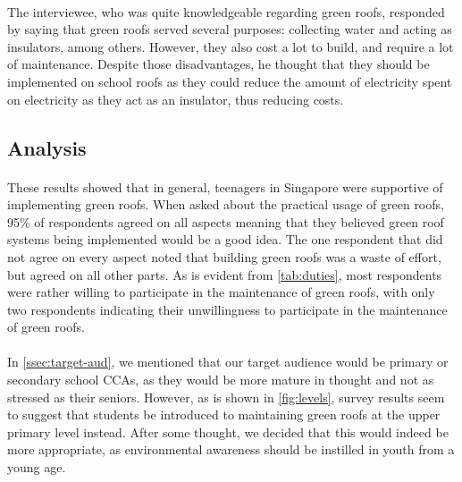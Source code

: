 \documentclass[a4paper]{article}
\begin{document}
\begin{multicols}{2}
  \paragraph{} The interviewee, who was quite knowledgeable
  regarding green roofs, responded by saying that green roofs served
  several purposes: collecting water and acting as insulators, among
  others. However, they also cost a lot to build, and require a lot of
  maintenance. Despite those disadvantages, he thought that they should
  be implemented on school roofs as they could reduce the amount of
  electricity spent on electricity as they act as an insulator, thus
  reducing costs.



  \subsection{Analysis}
  \paragraph{} These results showed that in general, teenagers in
  Singapore were supportive of implementing green roofs. When asked
  about the practical usage of green roofs, 95\% of respondents agreed
  on all aspects meaning that they believed green roof systems being
  implemented would be a good idea. The one respondent that did not agree
  on every aspect noted that building green roofs was a waste of effort,
  but agreed on all other parts. As is evident from \cref{tab:duties},
  most respondents were rather willing to participate in the maintenance
  of green roofs, with only two respondents indicating their unwillingness
  to participate in the maintenance of green roofs.

  \paragraph{} In \cref{ssec:target-aud}, we mentioned that our target
  audience would be primary or secondary school CCAs, as they would be
  more mature in thought and not as stressed as their seniors. However,
  as is shown in \cref{fig:levels}, survey results seem to suggest that
  students be introduced to maintaining green roofs at the upper primary
  level instead. After some thought, we decided that this would indeed
  be more appropriate, as environmental awareness should be instilled
  in youth from a young age.


\end{multicols}
\end{document}
